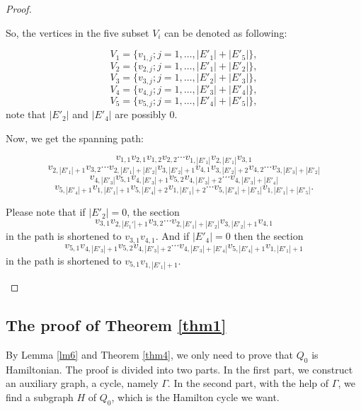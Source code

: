 \documentclass[12pt]{article}
\begin{document}
\begin{proof}
\begin{enumerate}
 So, the vertices in the five subset $V_i$ can be denoted as following:

$$V_1=\{v_{1,j};j=1,\ldots,|E'_1|+|E'_5|\},$$
$$V_2=\{v_{2,j};j=1,\ldots,|E'_1|+|E'_2|\},$$
$$V_3=\{v_{3,j};j=1,\ldots,|E'_2|+|E'_3|\},$$
$$V_4=\{v_{4,j};j=1,\ldots,|E'_3|+|E'_4|\},$$
$$V_5=\{v_{5,j};j=1,\ldots,|E'_4|+|E'_5|\},$$
note that $|E'_2|$ and $|E'_4|$ are possibly 0.

Now, we get the spanning path:

$$v_{1,1}v_{2,1}v_{1,2}v_{2,2}\cdots v_{1,|E'_1|}v_{2,|E'_1|}v_{3,1}$$
$$v_{2,|E'_1|+1}v_{3,2}\cdots v_{2,|E'_1|+|E'_2|}v_{3,|E'_2|+1}v_{4,1}v_{3,|E'_2|+2}v_{4,2}\cdots v_{3,|E'_3|+|E'_2|}$$
$$v_{4,|E'_3|}v_{5,1}v_{4,|E'_3|+1}v_{5,2}v_{4,|E'_3|+2}\cdots v_{4,|E'_3|+|E'_4|}$$
$$v_{5,|E'_4|+1}v_{1,|E'_1|+1}v_{5,|E'_4|+2}v_{1,|E'_1|+2}\cdots v_{5,|E'_4|+|E'_5|}v_{1,|E'_1|+|E'_5|}.$$

Please note that if $|E'_2|=0$, the section $$v_{3,1}v_{2,|E_1'|+1}v_{3,2}\cdots v_{2,|E'_1|+|E'_2|}v_{3,|E'_2|+1}v_{4,1}$$ in the path is shortened to $v_{3,1}v_{4,1}$. And if $|E'_4|=0$ then the section $$v_{5,1}v_{4,|E'_3|+1}v_{5,2}v_{4,|E'_3|+2}\cdots v_{4,|E'_3|+|E'_4|}v_{5,|E'_4|+1}v_{1,|E'_1|+1}$$ in the path is shortened to $v_{5,1}v_{1,|E'_1|+1}$.
\end{enumerate}\end{proof}

\subsection{The proof of Theorem \ref{thm1}}
By Lemma \ref{lm6} and Theorem \ref{thm4}, we only need to prove that $Q_0$ is Hamiltonian.
The proof is divided into two parts. In the first part, we construct an auxiliary graph, a cycle, namely $\Gamma$. In the second part, with the help of $\Gamma$, we find a subgraph $H$ of $Q_0$,  which is the Hamilton cycle we want.
\end{document}

